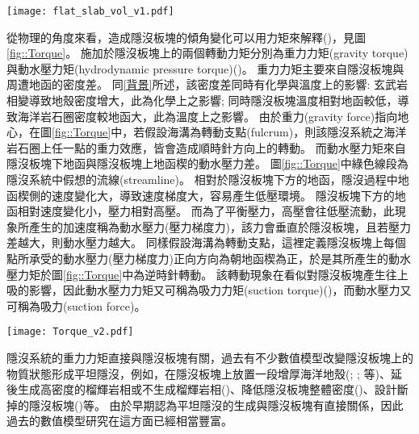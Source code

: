 \begin{figure*}[hp]
    \centering
    \texttt{[image: flat\_slab\_vol\_v1.pdf]}
    \caption[研究區域板塊構造圖]{研究區域板塊構造圖，灰色實線為板塊邊界，資料來自\citealp{bird2003updated}，橘紅色三角形為火山分佈，資料來自\citealp{venzke2013global}，黑色虛線為每50公里深之板塊等深度線，其中50、100與150公里等深度線加粗，資料來自\citealp{hayes2018slab2}。黃色框框圈起處為平坦隱沒位置，由北到南分別位於墨西哥、秘魯與智利。
    }
    \label{fig::flat_slab_vol}
\end{figure*}

從物理的角度來看，造成隱沒板塊的傾角變化可以用力矩來解釋(\citealp{stevenson1977angle})，見圖\ref{fig::Torque}。
施加於隱沒板塊上的兩個轉動力矩分別為重力力矩(gravity torque)與動水壓力矩(hydrodynamic pressure torque)(\citealp{McKenzie1969})。
重力力矩主要來自隱沒板塊與周遭地函的密度差。
同\ref{背景}所述，該密度差同時有化學與溫度上的影響: 玄武岩相變導致地殼密度增大，此為化學上之影響; 同時隱沒板塊溫度相對地函較低，導致海洋岩石圈密度較地函大，此為溫度上之影響。
由於重力(gravity force)指向地心，在圖\ref{fig::Torque}中，若假設海溝為轉動支點(fulcrum)，則該隱沒系統之海洋岩石圈上任一點的重力效應，皆會造成順時針方向上的轉動。
而動水壓力矩來自隱沒板塊下地函與隱沒板塊上地函楔的動水壓力差。
圖\ref{fig::Torque}中綠色線段為隱沒系統中假想的流線(streamline)。
相對於隱沒板塊下方的地函，隱沒過程中地函楔側的速度變化大，導致速度梯度大，容易產生低壓環境。
隱沒板塊下方的地函相對速度變化小，壓力相對高壓。
而為了平衡壓力，高壓會往低壓流動，此現象所產生的加速度稱為動水壓力(壓力梯度力)，該力會垂直於隱沒板塊，且若壓力差越大，則動水壓力越大。
同樣假設海溝為轉動支點，這裡定義隱沒板塊上每個點所承受的動水壓力(壓力梯度力)正向方向為朝地函楔為正，於是其所產生的動水壓力矩於圖\ref{fig::Torque}中為逆時針轉動。
該轉動現象在看似對隱沒板塊產生往上吸的影響，因此動水壓力力矩又可稱為吸力力矩(suction torque)(\citealp{tovish1978mantle})，而動水壓力又可稱為吸力(suction force)。

\begin{figure*}[ht!]
    \centering
    \texttt{[image: Torque\_v2.pdf]}
    \caption[隱沒系統中施加於隱沒板塊上的轉動力矩]{隱沒系統中施加於隱沒板塊上的轉動力矩，包含重力力矩與動水壓力矩。綠色線為軟流圈(asthenosphere)中的假想流線，灰圓底紅字H代表高壓區，灰圓底藍字代表低壓區。假設海溝為支點，大於0之重力力矩在該系統中施予一順時針方向上的轉動，反之大於0之動水壓力矩施予一逆時針方向上的轉動。
    }
    \label{fig::Torque}
\end{figure*}

隱沒系統的重力力矩直接與隱沒板塊有關，過去有不少數值模型改變隱沒板塊上的物質狀態形成平坦隱沒，例如，在隱沒板塊上放置一段增厚海洋地殼(\citealp{van2002role}; \citealp{Liu2016}; \citealp{Hu2016}等)、延後生成高密度的榴輝岩相或不生成榴輝岩相(\citealp{van2002role})、降低隱沒板塊整體密度(\citealp{Gerya2009})、設計斷掉的隱沒板塊(\citealp{Liu2016})等。
由於早期認為平坦隱沒的生成與隱沒板塊有直接關係，因此過去的數值模型研究在這方面已經相當豐富。

